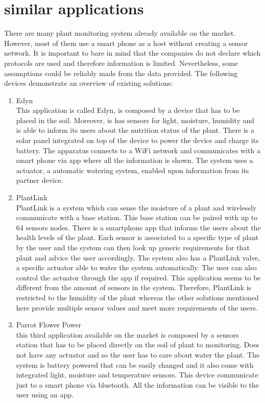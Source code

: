 \documentclass[conference]{IEEEtran}
\begin{document}
\section{similar applications}
There are many plant monitoring system already available on the market. However, most of them use a smart phone as a host without creating a sensor network. It is important to bare in mind that the companies do not declare which protocols are used and therefore information is limited. Nevertheless, some assumptions could be reliably made from the data provided. The following devices demonstrate an overview of existing solutions:\\
\begin{enumerate}
	\item Edyn \\
This application is called Edyn, is composed by a device that has to be placed in the soil. Moreover, is has sensors for light, moisture, humidity and is able to inform its users about the nutrition status of the plant. There is a solar panel integrated on top of the device to power the device and charge its battery. The apparatus connects to a WiFi network and communicates with a smart phone via app where all the information is shown. The system uses a actuator, a automatic watering system, enabled upon information from its partner device.\\
\item PlantLink\\
PlantLink is a system which can sense the moisture of a plant and wirelessly communicate with a base station. This base station can be paired with up to 64 sensors nodes. There is a smartphone app that informs the users about the health levels of the plant. Each sensor is associated to a specific type of plant by the user and the system can then look up generic requirements for that plant and advice the user accordingly. The system also has a PlantLink valve, a specific actuator able to water the system automatically. The user can also control the actuator through the app if required. This application seems to be different from the amount of sensors in the system. Therefore, PlantLink is restricted to the humidity of the plant whereas the other solutions mentioned here provide multiple sensor values and meet more requirements of the users.\\
\item Parrot Flower Power\\
this third application available on the market is composed by a sensors station that has to be placed directly on the soil of plant to monitoring. Does not have any actuator and so the user has to care about water the plant. The system is battery powered that can be easily changed and it also come with integrated light, moisture and temperature sensors. This device communicate just to a smart phone via bluetooth. All the information can be visible to the user using an app.
\end{enumerate}
\end{document}
